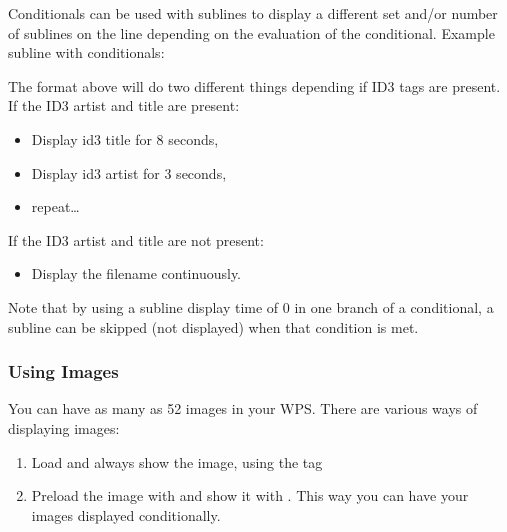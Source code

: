 Conditionals can be used with sublines to display a different set and/or number
of sublines on the line depending on the evaluation of the conditional.
Example subline with conditionals:
\begin{example}
\end{example}

The format above will do two different things depending if ID3 tags are 
present. If the ID3 artist and title are present:
\begin{itemize}
\item Display id3 title for 8 seconds,
\item Display id3 artist for 3 seconds,
\item repeat\dots
\end{itemize}
If the ID3 artist and title are not present:
\begin{itemize}
\item Display the filename continuously.
\end{itemize}
Note that by using a subline display time of 0 in one branch of a conditional,
a subline can be skipped (not displayed) when that condition is met. 

\subsubsection{Using Images}
You can have as many as 52 images in your WPS. There are various ways of 
displaying images:
\begin{enumerate}
  \item Load and always show the image, using the  tag
  \item Preload the image with  and show it with . 
    This way you can have your images displayed conditionally.
\end{enumerate}


